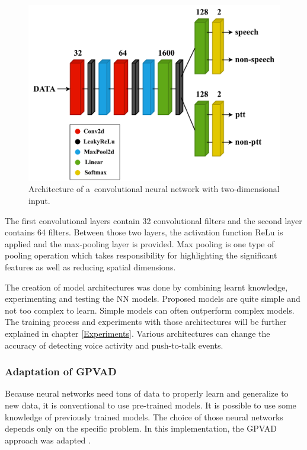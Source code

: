     \begin{figure}[ht!]
        \centering
        \includegraphics[width = \textwidth]{obrazky-figures/CNN2D.pdf}
        \caption{Architecture of a~convolutional neural network with two-dimensional input.}
        \label{fig:CNN2D}
    \end{figure}

    The first convolutional layers contain 32 convolutional filters and the second layer contains 64 filters.
    Between those two layers, the activation function ReLu is applied and the max-pooling layer is provided. Max pooling is one type of pooling operation which takes responsibility for highlighting the significant features as well as reducing spatial dimensions.

    The creation of model architectures was done by combining learnt knowledge, experimenting and testing the NN models. Proposed models are quite simple and not too complex to learn. Simple models can often outperform complex models. 
    The training process and experiments with those architectures will be further explained in chapter \ref{Experiments}. Various architectures can change the accuracy of detecting voice activity and push-to-talk events. 


\subsubsection{Adaptation of GPVAD}\label{GPVADarch}

    Because neural networks need tons of data to properly learn and generalize to new data, it is conventional to use pre-trained models. It is possible to use some knowledge of previously trained models. The choice of those neural networks depends only on the specific problem. In this implementation, the GPVAD approach was adapted \cite{Dinkel2020, Dinkel2021}.   

